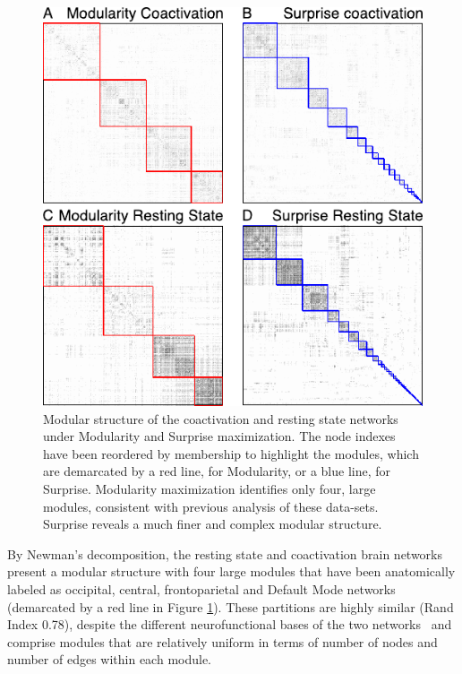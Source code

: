 \begin{figure}[htb!]
\centering
\includegraphics[width=1\linewidth]{images/figure_3_communities_rs_coact_mod_surp.pdf}
\caption{Modular structure of the coactivation and resting state networks under Modularity and Surprise maximization. The node indexes have been reordered by membership to highlight the modules, which are demarcated by a red line, for Modularity, or a blue line, for Surprise. Modularity maximization identifies only four, large modules, consistent with previous analysis of these data-sets. Surprise reveals a much finer and complex modular structure.}
\label{fig:figure_3_communities_rs_coact_mod_surp}
\end{figure}

By Newman’s decomposition, the resting state and coactivation brain networks present a modular structure with four large modules that have been anatomically labeled as occipital, central, frontoparietal and Default Mode networks~\cite{crossley2013a} (demarcated by a red line in Figure \ref{fig:figure_3_communities_rs_coact_mod_surp}). These partitions are highly similar (Rand Index 0.78), despite the different neurofunctional bases of the two networks~\cite{smith2009} and comprise modules that are relatively uniform in terms of number of nodes and number of edges within each module.


